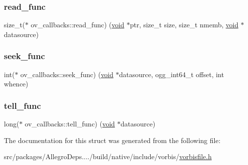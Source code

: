 \mbox{\label{structov__callbacks_a301b93b9f0436e5bde6dbdeb0edeae77}} 
\subsubsection{\texorpdfstring{read\+\_\+func}{read\_func}}
{\footnotesize\ttfamily size\+\_\+t($\ast$ ov\+\_\+callbacks\+::read\+\_\+func) (\hyperlink{png_8h_ac9c84fa68bbad002983e35ce3663c686}{void} $\ast$ptr, size\+\_\+t size, size\+\_\+t nmemb, \hyperlink{png_8h_ac9c84fa68bbad002983e35ce3663c686}{void} $\ast$datasource)}

\mbox{\label{structov__callbacks_aa49d8079756c1c26e2ba9b974e463dfa}} 
\subsubsection{\texorpdfstring{seek\+\_\+func}{seek\_func}}
{\footnotesize\ttfamily int($\ast$ ov\+\_\+callbacks\+::seek\+\_\+func) (\hyperlink{png_8h_ac9c84fa68bbad002983e35ce3663c686}{void} $\ast$datasource, ogg\+\_\+int64\+\_\+t offset, int whence)}

\mbox{\label{structov__callbacks_ab078f3f386b7c58e9fab2ede904e0e36}} 
\subsubsection{\texorpdfstring{tell\+\_\+func}{tell\_func}}
{\footnotesize\ttfamily long($\ast$ ov\+\_\+callbacks\+::tell\+\_\+func) (\hyperlink{png_8h_ac9c84fa68bbad002983e35ce3663c686}{void} $\ast$datasource)}



The documentation for this struct was generated from the following file\+:\begin{DoxyCompactItemize}
\item 
src/packages/\+Allegro\+Deps..../build/native/include/vorbis/\hyperlink{vorbisfile_8h}{vorbisfile.\+h}\end{DoxyCompactItemize}
